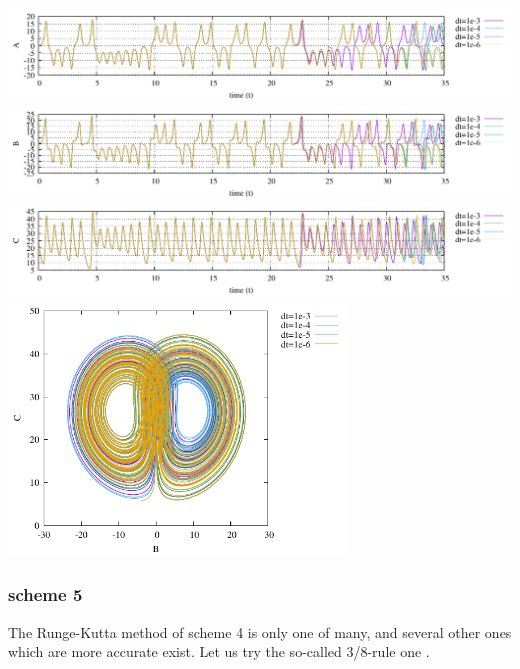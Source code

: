 \begin{center}
\includegraphics[width=16cm]{python_codes/fieldstone_156/results/scheme4/A.pdf}\\
\includegraphics[width=16cm]{python_codes/fieldstone_156/results/scheme4/B.pdf}\\
\includegraphics[width=16cm]{python_codes/fieldstone_156/results/scheme4/C.pdf}\\
\includegraphics[width=9cm]{python_codes/fieldstone_156/results/scheme4/BC.pdf}
\end{center}


\subsubsection*{scheme 5}

The Runge-Kutta method of scheme 4 is only one of many, and several other ones which are 
more accurate exist. 
Let us try the so-called 3/8-rule one .

